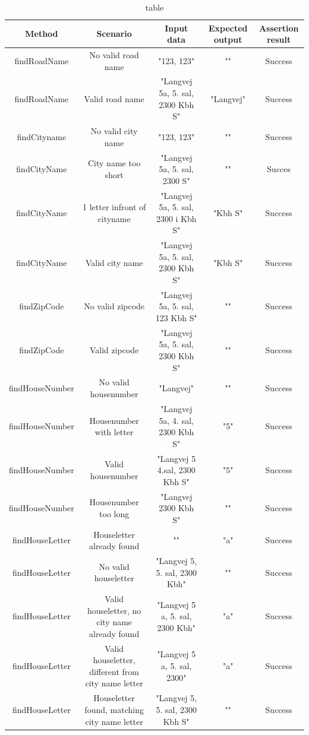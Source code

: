 \documentclass[a4paper,10pt,titlepage]{article}
\begin{document}
\begin{table}
\caption{table}
\centering
\begin{tabular}{c c c c c}
Method & Scenario & Input data & Expected output & Assertion result \\ [0.5ex] 
\hline
findRoadName & No valid road name & "123, 123" & "" & Success\\
findRoadName & Valid road name & "Langvej 5a, 5. sal, 2300 Kbh S" & "Langvej" & Success \\
findCityname & No valid city name & "123, 123" & "" & Success \\
findCityName & City name too short & "Langvej 5a, 5. sal, 2300 S" & "" & Succes\\
findCityName & 1 letter infront of cityname & "Langvej 5a, 5. sal, 2300 i Kbh S" & "Kbh S" & Success \\
findCityName & Valid city name & "Langvej 5a, 5. sal, 2300 Kbh S" & "Kbh S" & Success \\
findZipCode & No valid zipcode & "Langvej 5a, 5. sal, 123 Kbh S" & "" & Success \\
findZipCode & Valid zipcode & "Langvej 5a, 5. sal, 2300 Kbh S" & "" & Success \\
findHouseNumber & No valid housenumber & "Langvej" & "" & Success \\
findHouseNumber &  Housenumber with letter & "Langvej 5a, 4. sal, 2300 Kbh S" & "5" & Success \\
findHouseNumber & Valid housenumber & "Langvej 5 4.sal, 2300 Kbh S" & "5" & Success \\
findHouseNumber & Housenumber too long & "Langvej 2300 Kbh S" & "" & Success \\
findHouseLetter & Houseletter already found & "" & "a" & Success \\
findHouseLetter & No valid houseletter & "Langvej 5, 5. sal, 2300 Kbh" & "" & Success \\
findHouseLetter & Valid houseletter, no city name already found & "Langvej 5 a, 5. sal, 2300 Kbh" & "a" & Success \\
findHouseLetter & Valid houseletter, different from city name letter & "Langvej 5 a, 5. sal, 2300" & "a" & Success \\
findHouseLetter & Houseletter found, matching city name letter & "Langvej 5, 5. sal, 2300 Kbh S" & "" & Success



\end{tabular}
\end{table}
\end{document}
